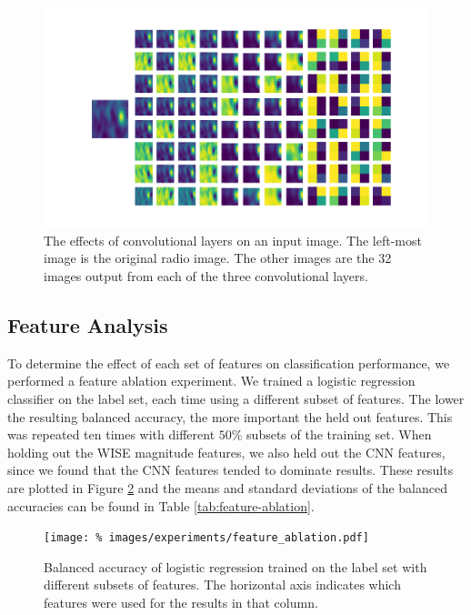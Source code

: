       \begin{figure}
        \centering
        \includegraphics[width=\textwidth]{images/rgz_cnn}
        \caption{The effects of convolutional layers on an input image. The
          left-most image is the original radio image. The other images are the
          32 images output from each of the three convolutional layers.}
        \label{fig:rgz-cnn}
      \end{figure}

  \subsection{Feature Analysis}
  \label{sec:feature-analysis}

    To determine the effect of each set of features on classification
    performance, we performed a feature ablation experiment. We trained a
    logistic regression classifier on the \citeauthor{norris06} label set, each
    time using a different subset of features. The lower the resulting balanced
    accuracy, the more important the held out features. This was repeated ten
    times with different $50\%$ subsets of the training set. When holding out
    the WISE magnitude features, we also held out the CNN features, since we
    found that the CNN features tended to dominate results. These results are
    plotted in Figure \ref{fig:feature-ablation} and the means and standard
    deviations of the balanced accuracies can be found in Table
    \ref{tab:feature-ablation}.

    \begin{figure}
      \centering
      \texttt{[image: \%
        images/experiments/feature\_ablation.pdf]}
      \caption{Balanced accuracy of logistic regression trained on the
        \citeauthor{norris06} label set with different subsets of features. The
        horizontal axis indicates which features were used for the results in
        that column.}
      \label{fig:feature-ablation}
    \end{figure}

